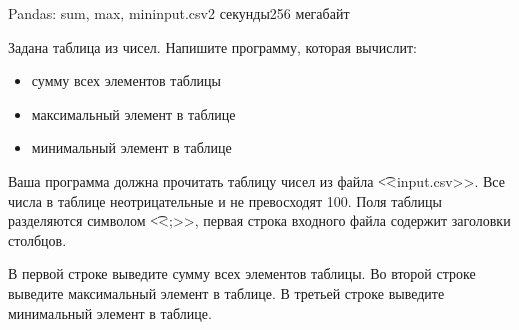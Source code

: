 \begin{problem}{Pandas: sum, max, min}{input.csv}{}{2 секунды}{256 мегабайт}

Задана таблица из чисел. 
Напишите программу, которая вычислит:
\begin{itemize} 
\item сумму всех элементов таблицы
\item максимальный элемент в таблице
\item минимальный элемент в таблице
\end{itemize}

\InputFile
Ваша программа должна прочитать таблицу чисел из файла {\t {<<input.csv>>}}.
Все числа в таблице неотрицательные и не превосходят 100.
Поля таблицы разделяются символом {\t{<<;>>}}, первая строка входного файла содержит заголовки столбцов.

\OutputFile
В первой строке выведите сумму всех элементов таблицы.
Во второй строке выведите максимальный элемент в таблице.
В третьей строке выведите минимальный элемент в таблице.

\Example
\begin{example}
%
\end{example}

\end{problem}

